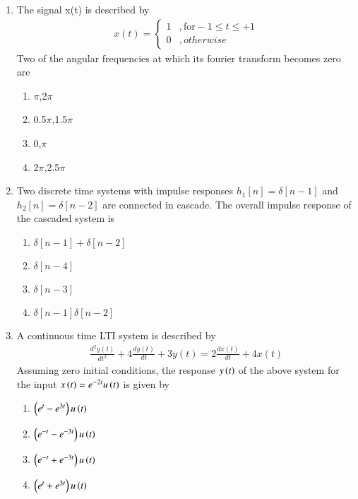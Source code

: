 \begin{enumerate}[label=\arabic*.,ref=\theenumi]
\begin{enumerate}
\end{enumerate}
\solution

\item The signal x(t) is described by 
\begin{align}
 x(t)=
\begin{cases}
1 & ,\text{for} -1 \leq t \leq +1\\
0 & ,otherwise
\end{cases} 
\end{align}
Two of the angular frequencies at which its fourier transform becomes zero are 
\begin{enumerate}
\item\label{1} $\pi$,2$\pi$
\item 0.5$\pi$,1.5$\pi$
\item 0,$\pi$
\item 2$\pi$,2.5$\pi$
\end{enumerate}
\solution

\item Two discrete time systems with impulse responses $h_1[n]=\delta[n-1]$ and $h_2[n]=\delta[n-2]$ are connected in cascade. The overall impulse response of the cascaded system is
\begin{enumerate}
    \item $\delta[n-1]+\delta[n-2]$
    \item $\delta[n-4]$
    \item $\delta[n-3]$
    \item $\delta[n-1]\delta[n-2]$
\end{enumerate}
\solution



\item A continuous time LTI system is described by
\begin{align}
    \frac{d^2y(t)}{dt^2}+4\frac{dy(t)}{dt}+3y(t) = 2\frac{dx(t)}{dt}+4x(t)\label{ec/2010/41/q}
\end{align}
Assuming zero initial conditions, the response $y\left(t\right)$ of the above system for the input $x\left(t\right)=e^{-2t}u\left(t\right)$ is given by
\begin{enumerate}
    \item $\left(e^t-e^{3t}\right)u\left(t\right)$
    \item $\left(e^{-t}-e^{-3t}\right)u\left(t\right)$
    \item $\left(e^{-t}+e^{-3t}\right)u\left(t\right)$
    \item $\left(e^{t}+e^{3t}\right)u\left(t\right)$
\end{enumerate}
\solution



\end{enumerate}
